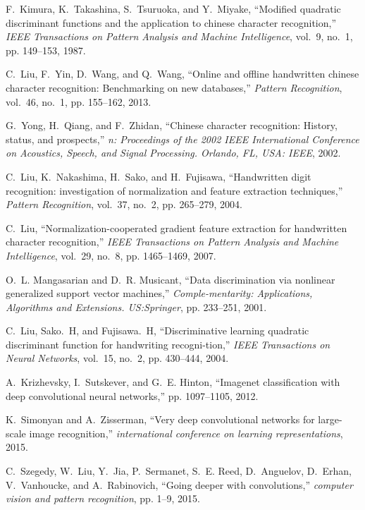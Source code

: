 \documentclass[conference]{IEEEtran}
\begin{document}
\begin{thebibliography}{1}
  
F.~Kimura, K.~Takashina, S.~Tsuruoka, and Y.~Miyake, ``Modified quadratic
discriminant functions and the application to chinese character
recognition,'' \emph{IEEE Transactions on Pattern Analysis and Machine
	Intelligence}, vol.~9, no.~1, pp. 149--153, 1987.

C.~Liu, F.~Yin, D.~Wang, and Q.~Wang, ``Online and offline handwritten chinese
character recognition: Benchmarking on new databases,'' \emph{Pattern
	Recognition}, vol.~46, no.~1, pp. 155--162, 2013.

G.~Yong, H.~Qiang, and F.~Zhidan, ``Chinese character recognition: History,
status, and prospects,'' \emph{n: Proceedings of the 2002 IEEE International
	Conference on Acoustics, Speech, and Signal Processing. Orlando, FL, USA:
	IEEE}, 2002.

C.~Liu, K.~Nakashima, H.~Sako, and H.~Fujisawa, ``Handwritten digit
recognition: investigation of normalization and feature extraction
techniques,'' \emph{Pattern Recognition}, vol.~37, no.~2, pp. 265--279, 2004.

C.~Liu, ``Normalization-cooperated gradient feature extraction for handwritten
character recognition,'' \emph{IEEE Transactions on Pattern Analysis and
	Machine Intelligence}, vol.~29, no.~8, pp. 1465--1469, 2007.

O.~L. Mangasarian and D.~R. Musicant, ``Data discrimination via nonlinear
generalized support vector machines,'' \emph{Comple-mentarity: Applications,
	Algorithms and Extensions. US:Springer}, pp. 233--251, 2001.

C.~Liu, Sako.~H, and Fujisawa.~H, ``Discriminative learning quadratic
discriminant function for handwriting recogni-tion,'' \emph{IEEE Transactions
	on Neural Networks}, vol.~15, no.~2, pp. 430--444, 2004.

A.~Krizhevsky, I.~Sutskever, and G.~E. Hinton, ``Imagenet classification with
deep convolutional neural networks,'' pp. 1097--1105, 2012.

K.~Simonyan and A.~Zisserman, ``Very deep convolutional networks for
large-scale image recognition,'' \emph{international conference on learning
	representations}, 2015.

C.~Szegedy, W.~Liu, Y.~Jia, P.~Sermanet, S.~E. Reed, D.~Anguelov, D.~Erhan,
V.~Vanhoucke, and A.~Rabinovich, ``Going deeper with convolutions,''
\emph{computer vision and pattern recognition}, pp. 1--9, 2015.


\end{thebibliography}
\end{document}
